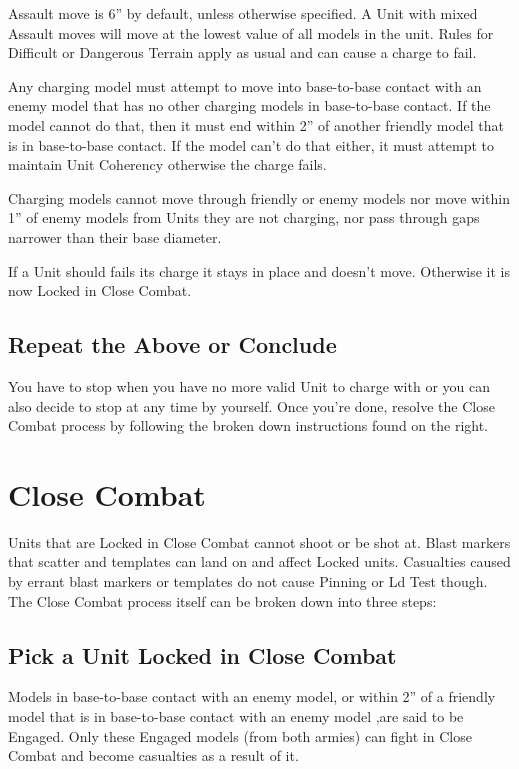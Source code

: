 Assault move is 6” by default, unless otherwise specified. A
Unit with mixed Assault moves will move at the lowest value of
all models in the unit. Rules for Difficult or Dangerous Terrain
apply as usual and can cause a charge to fail.

Any charging model must attempt to move into base-to-base
contact with an enemy model that has no other charging
models in base-to-base contact. If the model cannot do that,
then it must end within 2” of another friendly model that is in
base-to-base contact. If the model can't do that either, it must
attempt to maintain Unit Coherency otherwise the charge fails.

Charging models cannot move through friendly or enemy
models nor move within 1” of enemy models from Units they
are not charging, nor pass through gaps narrower than their
base diameter.

If a Unit should fails its charge it stays in place and doesn't
move. Otherwise it is now Locked in Close Combat.

\subsection{Repeat the Above or Conclude}
You have to stop when you have no more valid Unit to charge
with or you can also decide to stop at any time by yourself.
Once you're done, resolve the Close Combat process by
following the broken down instructions found on the right.

\stopcountsubsections

\section{Close Combat}

Units that are Locked in Close Combat cannot shoot or be shot
at. Blast markers that scatter and templates can land on and
affect Locked units. Casualties caused by errant blast markers
or templates do not cause Pinning or Ld Test though.
The Close Combat process itself can be broken down into
three steps:

\countsubsections

\subsection{Pick a Unit Locked in Close Combat}
\label{step:pickunitforchage}
Models in base-to-base contact with an enemy model, or
within 2” of a friendly model that is in base-to-base contact with
an enemy model ,are said to be Engaged. Only these
Engaged models (from both armies) can fight in Close Combat
and become casualties as a result of it.


